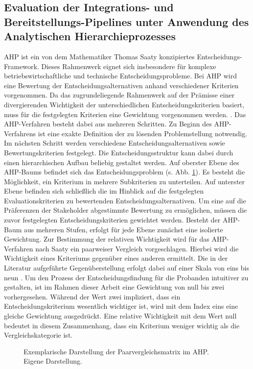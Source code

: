 \subsection{Evaluation der Integrations- und Bereitstellungs-Pipelines unter Anwendung des Analytischen Hierarchieprozesses}
AHP ist ein von dem Mathematiker Thomas Saaty konzipiertes Entscheidungs-Framework. Dieses Rahmenwerk eignet sich insbesondere für komplexe betriebswirtschaftliche und technische Entscheidungsprobleme. Bei AHP wird eine Bewertung der Entscheidungsalternativen anhand verschiedener Kriterien vorgenommen.  Da das zugrundeliegende Rahmenwerk auf der Prämisse einer divergierenden Wichtigkeit der unterschiedlichen Entscheidungskriterien basiert, muss für die festgelegten Kriterien eine Gewichtung vorgenommen werden. \cite[86]{Saaty.2008}. Das AHP-Verfahren besteht dabei aus mehreren Schritten. Zu Beginn des AHP-Verfahrens ist eine exakte Definition der zu lösenden Problemstellung notwendig. Im nächsten Schritt werden verschiedene Entscheidungsalternativen sowie Bewertungskriterien festgelegt. Die Entscheidungsstruktur kann dabei durch einen hierarchischen Aufbau beliebig gestaltet werden. Auf oberster Ebene des AHP-Baums befindet sich das Entscheidungsproblem (s. Abb. \ref*{fig:AHP_B}). Es besteht die Möglichkeit, ein Kriterium in mehrere Subkriterien zu unterteilen. Auf unterster Ebene befinden sich schließlich die im Hinblick auf die festgelegten Evaluationskriterien zu bewertenden Entscheidungsalternativen. Um eine auf die Präferenzen der Stakeholder abgestimmte Bewertung zu ermöglichen, müssen die zuvor festgelegten Entscheidungskriterien gewichtet werden. Besteht der AHP-Baum aus mehreren Stufen, erfolgt für jede Ebene zunächst eine isolierte Gewichtung. Zur Bestimmung der relativen Wichtigkeit wird für das AHP-Verfahren nach Saaty ein paarweiser Vergleich vorgeschlagen. Hierbei wird die Wichtigkeit eines Kriteriums gegenüber eines anderen ermittelt. Die in der Literatur aufgeführte Gegenüberstellung erfolgt dabei auf einer Skala von eins bis neun \cite[86]{Saaty.2008}. Um den Prozess der Entscheidungsfindung für die Probanden intuitiver zu gestalten, ist im Rahmen dieser Arbeit eine Gewichtung von null bis zwei vorhergesehen. Während der Wert zwei impliziert, dass ein Entscheidungskriterium wesentlich wichtiger ist, wird mit dem Index eins eine gleiche Gewichtung ausgedrückt. Eine relative Wichtigkeit mit dem Wert null bedeutet in diesem Zusammenhang, dass ein Kriterium weniger wichtig als die Vergleichskategorie ist.  
\begin{center}
	\begin{figure}[H]
		\centering
		\caption[Exemplarische Darstellung der Paarvergleichsmatrix im AHP]{Exemplarische Darstellung der Paarvergleichsmatrix im AHP.\\ Eigene Darstellung.}
		\label{fig:AHP_B}
	\end{figure}
\end{center}
